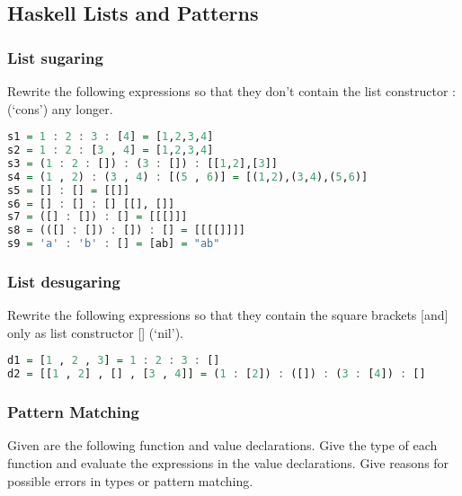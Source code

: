 \hypertarget{haskell-lists-and-patterns}{%
\subsection{Haskell Lists and Patterns}\label{haskell-lists-and-patterns}}

\hypertarget{list-sugaring}{%
\subsubsection{List sugaring}\label{list-sugaring}}

Rewrite the following expressions so that they don't contain the list
constructor : (`cons') any longer.

\begin{lstlisting}[language=Haskell]
s1 = 1 : 2 : 3 : [4] = [1,2,3,4]
s2 = 1 : 2 : [3 , 4] = [1,2,3,4]
s3 = (1 : 2 : []) : (3 : []) : [[1,2],[3]]
s4 = (1 , 2) : (3 , 4) : [(5 , 6)] = [(1,2),(3,4),(5,6)]
s5 = [] : [] = [[]]
s6 = [] : [] : [] [[], []]
s7 = ([] : []) : [] = [[[]]]
s8 = (([] : []) : []) : [] = [[[[]]]]
s9 = 'a' : 'b' : [] = [ab] = "ab"
\end{lstlisting}

\hypertarget{list-desugaring}{%
\subsubsection{List desugaring}\label{list-desugaring}}

Rewrite the following expressions so that they contain the square
brackets {[}and{]} only as list constructor {[}{]} (`nil').

\begin{lstlisting}[language=Haskell]
d1 = [1 , 2 , 3] = 1 : 2 : 3 : []
d2 = [[1 , 2] , [] , [3 , 4]] = (1 : [2]) : ([]) : (3 : [4]) : []
\end{lstlisting}

\hypertarget{pattern-matching}{%
\subsubsection{Pattern Matching}\label{pattern-matching}}

Given are the following function and value declarations. Give the type
of each function and evaluate the expressions in the value declarations.
Give reasons for possible errors in types or pattern matching.

